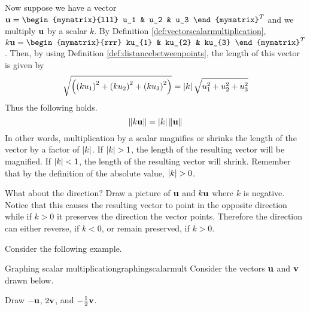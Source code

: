 Now suppose we have a vector $\vect{u} = \begin{mymatrix}{lll}
u_1 &  u_2 & u_3 
\end{mymatrix}^T$ and we multiply ${\bf u}$ by a
scalar $k$. By Definition \ref{def:vectorscalarmultiplication},
$k\vect{u} = \begin{mymatrix}{rrr}
ku_{1} & ku_{2} & ku_{3}
\end{mymatrix}^T $. 
Then, by using Definition \ref{def:distancebetweenpoints}, the length of this vector is given by 
\begin{equation*}
\sqrt{\left(\left(k u_{1}\right) ^{2}+\left(k u_{2}\right)
^{2}+\left(k u_{3}\right) ^{2}\right) }=\left|k \right|\sqrt{u_{1}^{2}+u_{2}^{2}+u_{3}^{2}}
\end{equation*}
Thus the following holds.
\begin{equation*}
\| k {\bf u} \| =\left|k \right|\| {\bf u} \| 
\end{equation*}
In other words, multiplication by a scalar magnifies or shrinks the length
of the vector by a factor of $\left|k\right|$. If $\abs{k}> 1$, the length of the resulting vector will 
be magnified. If $\left|k\right|<1$, the length of the resulting vector will shrink. Remember that by the definition 
of the absolute value, $\abs{k}>0$. 

What about the direction? Draw a picture of ${\bf u}$ and $k{\bf u}$
where $k$ is negative. Notice that this causes the resulting vector
to point in the opposite direction while if $k >0$ it preserves the
direction the vector points. Therefore the direction can either
reverse, if $k < 0$, or remain preserved, if $k > 0$.

Consider the following example.

\begin{example}{Graphing scalar multiplication}{graphingscalarmult}
Consider the vectors ${\bf u}$ and ${\bf v}$ drawn below. 

\begin{center}
\end{center}

Draw  $-{\bf u}$, $2{\bf v}$, and $-\frac{1}{2}{\bf v}$.
\end{example}

